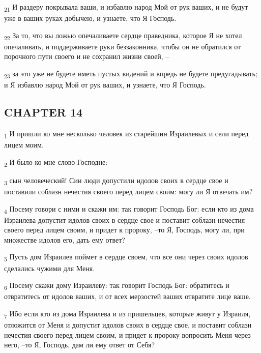 \begin{tcolorbox}
\textsubscript{21} И раздеру покрывала ваши, и избавлю народ Мой от рук ваших, и не будут уже в ваших руках добычею, и узнаете, что Я Господь.
\end{tcolorbox}
\begin{tcolorbox}
\textsubscript{22} За то, что вы ложью опечаливаете сердце праведника, которое Я не хотел опечаливать, и поддерживаете руки беззаконника, чтобы он не обратился от порочного пути своего и не сохранил жизни своей, --
\end{tcolorbox}
\begin{tcolorbox}
\textsubscript{23} за это уже не будете иметь пустых видений и впредь не будете предугадывать; и Я избавлю народ Мой от рук ваших, и узнаете, что Я Господь.
\end{tcolorbox}
\subsection{CHAPTER 14}
\begin{tcolorbox}
\textsubscript{1} И пришли ко мне несколько человек из старейшин Израилевых и сели перед лицем моим.
\end{tcolorbox}
\begin{tcolorbox}
\textsubscript{2} И было ко мне слово Господне:
\end{tcolorbox}
\begin{tcolorbox}
\textsubscript{3} сын человеческий! Сии люди допустили идолов своих в сердце свое и поставили соблазн нечестия своего перед лицем своим: могу ли Я отвечать им?
\end{tcolorbox}
\begin{tcolorbox}
\textsubscript{4} Посему говори с ними и скажи им: так говорит Господь Бог: если кто из дома Израилева допустит идолов своих в сердце свое и поставит соблазн нечестия своего перед лицем своим, и придет к пророку, --то Я, Господь, могу ли, при множестве идолов его, дать ему ответ?
\end{tcolorbox}
\begin{tcolorbox}
\textsubscript{5} Пусть дом Израилев поймет в сердце своем, что все они через своих идолов сделались чужими для Меня.
\end{tcolorbox}
\begin{tcolorbox}
\textsubscript{6} Посему скажи дому Израилеву: так говорит Господь Бог: обратитесь и отвратитесь от идолов ваших, и от всех мерзостей ваших отвратите лице ваше.
\end{tcolorbox}
\begin{tcolorbox}
\textsubscript{7} Ибо если кто из дома Израилева и из пришельцев, которые живут у Израиля, отложится от Меня и допустит идолов своих в сердце свое, и поставит соблазн нечестия своего перед лицем своим, и придет к пророку вопросить Меня через него, --то Я, Господь, дам ли ему ответ от Себя?
\end{tcolorbox}
